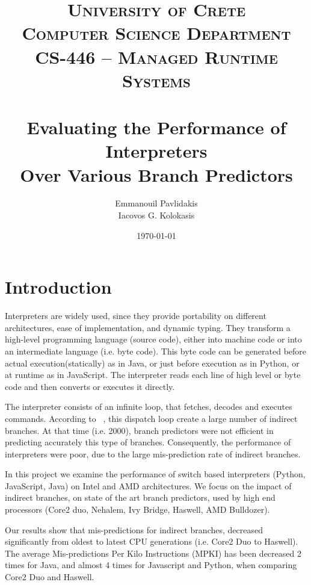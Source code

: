 \documentclass[parskip=full, paper=a4, fontsize=12pt]{scrartcl}
\title{%
\normalfont \normalsize 
\textsc{University of Crete\\
Computer Science Department \\
CS-446 -- Managed Runtime Systems} \\ [20pt] 
\horrule{0.5pt} \\[0.4cm]
\huge
Evaluating the Performance of Interpreters\\Over Various Branch Predictors
\horrule{2pt} \\[0.5cm] 
}
\author{%
    Emmanouil Pavlidakis \\
    Iacovos G. Kolokasis%
    }
\date{\normalsize\today}
\numberwithin{equation}{section}
\numberwithin{figure}{section}
\numberwithin{table}{section}
\begin{document}
\maketitle 

\section{Introduction}

Interpreters are widely used, since they provide portability on different architectures,
ease of implementation, and dynamic typing. They transform a high-level programming 
language (source code), either into machine code or into an intermediate language (i.e. byte code). 
This byte code can be generated before actual execution(statically) as in Java, or just 
before execution as in Python, or at runtime as in JavaScript. The interpreter reads each 
line of high level or byte code and then converts or executes it directly. 

The interpreter consists of an infinite loop, that fetches, decodes and executes commands.
According to ~\cite{ertl2003structure}, this dispatch loop create a large number of indirect
branches. At that time (i.e. 2000), branch predictors were not efficient in predicting 
accurately this type of branches. Consequently, the performance of interpreters were poor, 
due to the large mis-prediction rate of indirect branches.  

In this project we examine the performance of switch based interpreters (Python, JavaScript, Java) 
on Intel and AMD architectures. We focus on the impact of indirect branches, on state of the art 
branch predictors, used by high end processors (Core2 duo, Nehalem, Ivy Bridge, Haswell, AMD Bulldozer).

Our results show that mis-predictions for indirect branches, decreased significantly from oldest to latest
CPU generations (i.e. Core2 Duo to Haswell). The average Mis-predictions Per Kilo Instructions (MPKI) has
been decreased 2 times for Java, and almost 4 times for Javascript and Python, when comparing Core2 Duo and Haswell.   


\end{document}
